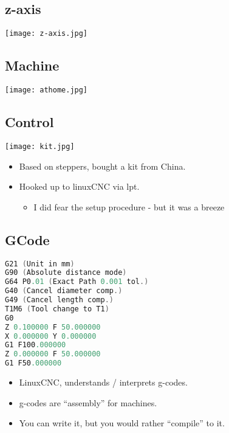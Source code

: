 \documentclass[11pt]{beamer}
\begin{document}
\subsection*{z-axis}\begin{frame}[fragile]
\label{sec-3.3}

\texttt{[image: z-axis.jpg]}

\end{frame}
\subsection*{Machine}\begin{frame}[fragile]
\label{sec-3.4}

\texttt{[image: athome.jpg]}

\end{frame}
\subsection*{Control}\begin{frame}[fragile]
\label{sec-3.5}

\texttt{[image: kit.jpg]}
\begin{itemize}
\item Based on steppers, bought a kit from China.
\item Hooked up to linuxCNC via lpt.

\begin{itemize}
\item I did fear the setup procedure - but it was a breeze
\end{itemize}

\end{itemize}
\end{frame}
\subsection*{GCode}\begin{frame}[fragile]
\label{sec-3.6}

\begin{lstlisting}[language=c]
G21 (Unit in mm)
G90 (Absolute distance mode)
G64 P0.01 (Exact Path 0.001 tol.)
G40 (Cancel diameter comp.)
G49 (Cancel length comp.)
T1M6 (Tool change to T1)
G0 
Z 0.100000 F 50.000000
X 0.000000 Y 0.000000 
G1 F100.000000 
Z 0.000000 F 50.000000
G1 F50.000000 
\end{lstlisting}
\begin{itemize}
\item LinuxCNC, understands / interprets g-codes.
\item g-codes are ``assembly'' for machines.
\item You can write it, but you would rather ``compile'' to it.
\end{itemize}
\end{frame}
\end{document}
